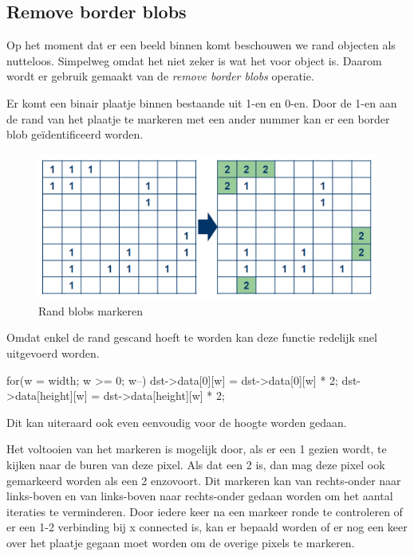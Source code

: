 \subsection{Remove border blobs}

Op het moment dat er een beeld binnen komt beschouwen we rand objecten als
nutteloos. Simpelweg omdat het niet zeker is wat het voor object is. Daarom
wordt er gebruik gemaakt van de \emph{remove border blobs} operatie.

Er komt een binair plaatje binnen bestaande uit 1-en en 0-en. Door de 1-en
aan de rand van het plaatje te markeren met een ander nummer kan er een
border blob geïdentificeerd worden.

\begin{figure}
    \begin{center}
        \includegraphics[scale=0.5]{figures/border_blob_step1.png}
    \end{center}
    \caption{Rand blobs markeren}
    \label{fig:bbstep1}
\end{figure}

Omdat enkel de rand gescand hoeft te worden kan deze functie redelijk snel
uitgevoerd worden.

\begin{cppcode}
    for(w = width; w >= 0; w--){
        dst->data[0][w]      = dst->data[0][w] * 2;
        dst->data[height][w] = dst->data[height][w] * 2;
    }
\end{cppcode}

Dit kan uiteraard ook even eenvoudig voor de hoogte worden gedaan.

Het voltooien van het markeren is mogelijk door, als er een 1 gezien wordt,
te kijken naar de buren van deze pixel. Als dat een 2 is, dan mag deze pixel
ook gemarkeerd worden als een 2 enzovoort. Dit markeren kan van rechts-onder
naar links-boven en van links-boven naar rechts-onder gedaan worden om het
aantal iteraties te verminderen. Door iedere keer na een markeer ronde te
controleren of er een 1-2 verbinding bij x connected is, kan er bepaald worden
of er nog een keer over het plaatje gegaan moet worden om de overige pixels te
markeren.

